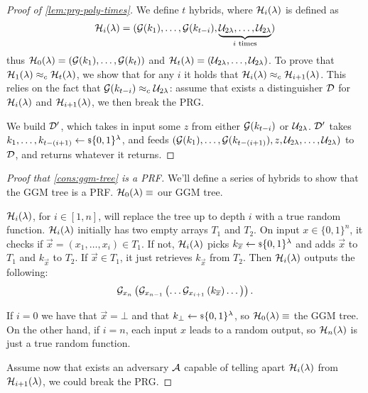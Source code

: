 \begin{proof}[Proof of \cref{lem:prg-poly-times}]
	We define $t$ hybrids, where $\mathcal{H}_i(\lambda)$ is defined as
	\begin{equation*}
		\mathcal{H}_i(\lambda) = ( \mathcal{G}(k_1), \dots, \mathcal{G}(k_{t-i}), \underbrace{\mathcal{U}_{2\lambda}, \dots, \mathcal{U}_{2\lambda}}_{i \text{ times}} )
	\end{equation*}
	thus $\mathcal{H}_0(\lambda) = (\mathcal{G}(k_1), \dots, \mathcal{G}(k_t))$ and $\mathcal{H}_t(\lambda) = (\mathcal{U}_{2\lambda}, \dots, \mathcal{U}_{2\lambda})$.
	To prove that $\mathcal{H}_1(\lambda) \approx_c \mathcal{H}_t(\lambda)$, we show that for any $i$ it holds that $\mathcal{H}_i(\lambda) \approx_c \mathcal{H}_{i+1}(\lambda)$.
	This relies on the fact that $\mathcal{G}(k_{t-i}) \approx_c \mathcal{U}_{2\lambda}$: assume that exists a distinguisher $\mathcal{D}$ for $\mathcal{H}_{i}(\lambda)$ and $\mathcal{H}_{i+1}(\lambda)$, we then break the \ac{PRG}.

	We build $\mathcal{D}'$, which takes in input some $z$ from either $\mathcal{G}(k_{t-i})$ or $\mathcal{U}_{2\lambda}$.
	$\mathcal{D}'$ takes $k_1, \dots, k_{t-(i+1)} \leftarrow {\scriptstyle \$} {\{0,1\}^{\lambda}}$, and feeds $(\mathcal{G}(k_1), \dots, \mathcal{G}(k_{t-(i+1)}), z, \mathcal{U}_{2\lambda}, \dots, \mathcal{U}_{2\lambda})$ to $\mathcal{D}$, and returns whatever it returns.
\end{proof}

\begin{proof}[Proof that \cref{cons:ggm-tree} is a \acs{PRF}]
	We'll define a series of hybrids to show that the \ac{GGM} tree is a \ac{PRF}.
	$\mathcal{H}_0(\lambda) \equiv$ our \ac{GGM} tree.

	$\mathcal{H}_i(\lambda)$, for $i \in [1, n]$, will replace the tree up to depth $i$ with a true random function.
	$\mathcal{H}_i(\lambda)$ initially has two empty arrays $T_1$ and $T_2$.
	On input $x \in \{0,1\}^{n}$, it checks if $\vec{x} = (x_1, \dots, x_i) \in T_1$.
	If not, $\mathcal{H}_i(\lambda)$ picks $k_{\overline{x}} \leftarrow {\scriptstyle \$} {\{0,1\}^{\lambda}}$ and adds $\vec{x}$ to $T_1$ and $k_{\vec{x}}$ to $T_2$.
	If $\vec{x} \in T_1$, it just retrieves $k_{\vec{x}}$ from $T_2$.
	Then $\mathcal{H}_i(\lambda)$ outputs the following:
	\begin{equation*}
		\mathcal{G}_{x_n} \left( \mathcal{G}_{x_{n-1}} \left( \dots \mathcal{G}_{x_{i+1}} \left( k_{\overline{x}} \right) \dots \right) \right).
	\end{equation*}

	If $i = 0$ we have that $\vec{x} = \bot$ and that $k_{\bot} \leftarrow {\scriptstyle \$} {\{0,1\}^{\lambda}}$, so $\mathcal{H}_{0}(\lambda) \equiv$ the \ac{GGM} tree.
	On the other hand, if $i = n$, each input $x$ leads to a random output, so $\mathcal{H}_{n}(\lambda)$ is just a true random function.

	Assume now that exists an adversary $\mathcal{A}$ capable of telling apart $\mathcal{H}_{i}(\lambda)$ from $\mathcal{H}_{i+1}(\lambda)$, we could break the \ac{PRG}.
\end{proof}

